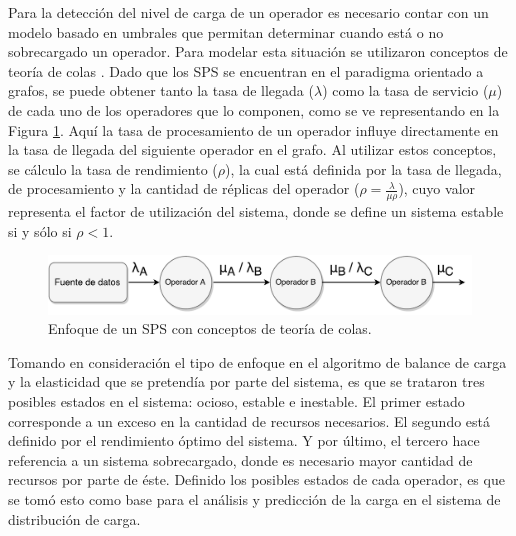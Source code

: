 
Para la detección del nivel de carga de un operador es necesario contar con un modelo basado en umbrales que permitan determinar cuando está o no sobrecargado un operador. Para modelar esta situación se utilizaron conceptos de teoría de colas \citep{bose2013introduction}. Dado que los SPS se encuentran en el paradigma orientado a grafos, se puede obtener tanto la tasa de llegada ($\lambda$) como la tasa de servicio ($\mu$) de cada uno de los operadores que lo componen, como se ve representando en la Figura \ref{fig:analisisTeoriaColas}. Aquí la tasa de procesamiento de un operador influye directamente en la tasa de llegada del siguiente operador en el grafo. Al utilizar estos conceptos, se cálculo la tasa de rendimiento ($\rho$), la cual está definida por la tasa de llegada, de procesamiento y la cantidad de réplicas del operador ($\rho = \frac{\lambda}{\mu \rho}$), cuyo valor representa el factor de utilización del sistema, donde se define un sistema estable si y sólo si $\rho < 1$.

\begin{figure}[!hb]
	\centering
		\includegraphics[scale=0.6]{images/AnalisisTeoriaColas.pdf}
	\caption{Enfoque de un SPS con conceptos de teoría de colas.}
	\label{fig:analisisTeoriaColas}
\end{figure}

Tomando en consideración el tipo de enfoque en el algoritmo de balance de carga y la elasticidad que se pretendía por parte del sistema, es que se trataron tres posibles estados en el sistema: ocioso, estable e inestable. El primer estado corresponde a un exceso en la cantidad de recursos necesarios. El segundo está definido por el rendimiento óptimo del sistema. Y por último, el tercero hace referencia a un sistema sobrecargado, donde es necesario mayor cantidad de recursos por parte de éste. Definido los posibles estados de cada operador, es que se tomó esto como base para el análisis y predicción de la carga en el sistema de distribución de carga.

